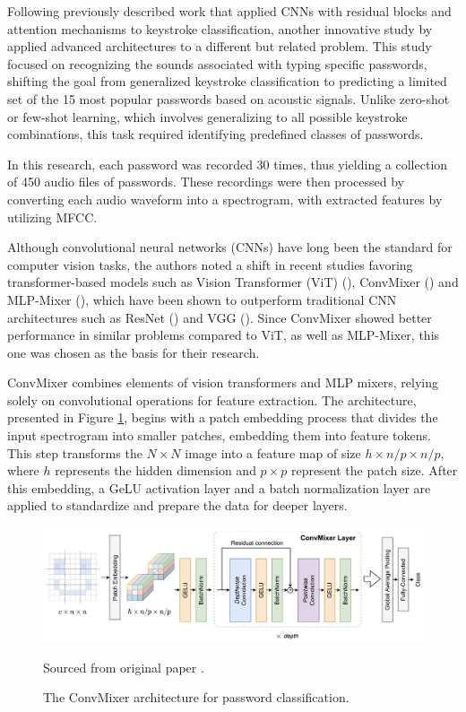 \documentclass[a4paper,11pt,twoside]{report}
\theoremstyle{definition}
\begin{document}
Following previously described work that applied CNNs with residual blocks and attention mechanisms to keystroke classification, another innovative study by \textit{\cite{2023convmixer}} applied advanced architectures to a different but related problem. This study focused on recognizing the sounds associated with typing specific passwords, shifting the goal from generalized keystroke classification to predicting a limited set of the 15 most popular passwords based on acoustic signals. Unlike zero-shot or few-shot learning, which involves generalizing to all possible keystroke combinations, this task required identifying predefined classes of passwords.

In this research, each password was recorded 30 times, thus yielding a collection of 450 audio files of passwords. These recordings were then processed by converting each audio waveform into a spectrogram, with extracted features by utilizing MFCC.

Although convolutional neural networks (CNNs) have long been the standard for computer vision tasks, the authors noted a shift in recent studies favoring transformer-based models such as Vision Transformer (ViT) (\textit{\cite{vit}}), ConvMixer (\textit{\cite{convmixer}}) and MLP-Mixer (\textit{\cite{mlpMixer}}), which have been shown to outperform traditional CNN architectures such as ResNet (\textit{\cite{resnet}}) and VGG (\textit{\cite{vgg}}). Since ConvMixer showed better performance in similar problems compared to ViT, as well as MLP-Mixer, this one was chosen as the basis for their research.

ConvMixer combines elements of vision transformers and MLP mixers, relying solely on convolutional operations for feature extraction. The architecture, presented in Figure \ref{fig:convmixer}, begins with a patch embedding process that divides the input spectrogram into smaller patches, embedding them into feature tokens. This step transforms the $N \times N$ image into a feature map of size $h \times n/p \times n/p$, where $h$ represents the hidden dimension and $p \times p$ represent the patch size. After this embedding, a GeLU activation layer and a batch normalization layer are applied to standardize and prepare the data for deeper layers.

\begin{figure}[h!]
    \centering
    \includegraphics[width=\textwidth]{img_related_work/convmixer.png}
    \caption{The ConvMixer architecture for password classification.}
    \footnotesize{Sourced from original paper \cite{2023convmixer}.}
    \label{fig:convmixer}
\end{figure}
\end{document}
